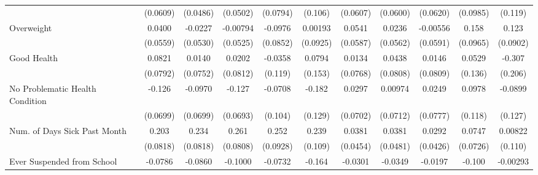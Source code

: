 {\begin{tabular}{l*{10}{c}}
            &    (0.0609)         &    (0.0486)         &    (0.0502)         &    (0.0794)         &     (0.106)         &    (0.0607)         &    (0.0600)         &    (0.0620)         &    (0.0985)         &     (0.119)         \\
\addlinespace
Overweight  &      0.0400         &     -0.0227         &    -0.00794         &     -0.0976         &     0.00193         &      0.0541         &      0.0236         &    -0.00556         &       0.158         &       0.123         \\
            &    (0.0559)         &    (0.0530)         &    (0.0525)         &    (0.0852)         &    (0.0925)         &    (0.0587)         &    (0.0562)         &    (0.0591)         &    (0.0965)         &    (0.0902)         \\
\addlinespace
Good Health &      0.0821         &      0.0140         &      0.0202         &     -0.0358         &      0.0794         &      0.0134         &      0.0438         &      0.0146         &      0.0529         &      -0.307         \\
            &    (0.0792)         &    (0.0752)         &    (0.0812)         &     (0.119)         &     (0.153)         &    (0.0768)         &    (0.0808)         &    (0.0809)         &     (0.136)         &     (0.206)         \\
\addlinespace
No Problematic Health Condition&      -0.126         &     -0.0970         &      -0.127         &     -0.0708         &      -0.182         &      0.0297         &     0.00974         &      0.0249         &      0.0978         &     -0.0899         \\
            &    (0.0699)         &    (0.0699)         &    (0.0693)         &     (0.104)         &     (0.129)         &    (0.0702)         &    (0.0712)         &    (0.0777)         &     (0.118)         &     (0.127)         \\
\addlinespace
Num. of Days Sick Past Month&       0.203\sym{*}  &       0.234\sym{**} &       0.261\sym{**} &       0.252\sym{**} &       0.239\sym{*}  &      0.0381         &      0.0381         &      0.0292         &      0.0747         &     0.00822         \\
            &    (0.0818)         &    (0.0818)         &    (0.0808)         &    (0.0928)         &     (0.109)         &    (0.0454)         &    (0.0481)         &    (0.0426)         &    (0.0726)         &     (0.110)         \\
\addlinespace
Ever Suspended from School&     -0.0786\sym{*}  &     -0.0860\sym{*}  &     -0.1000\sym{*}  &     -0.0732         &      -0.164\sym{*}  &     -0.0301         &     -0.0349         &     -0.0197         &      -0.100         &    -0.00293         \\

\end{tabular}}
